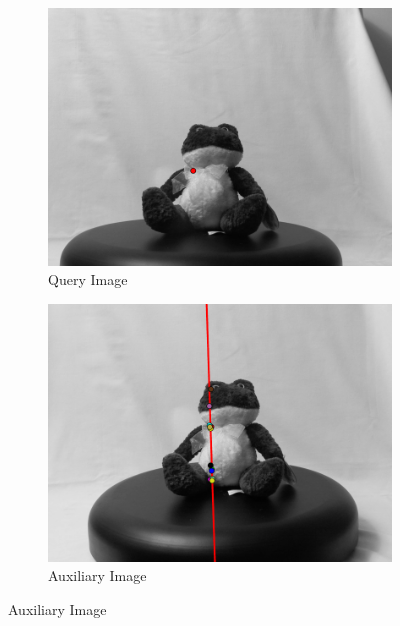 \documentclass[review]{elsarticle}
\begin{document}
\begin{figure}[htb]
    \centering
    \begin{subfigure}[t]{0.22\columnwidth}
        \centering
        \includegraphics[width=\columnwidth]{images/Frog_A}
        \caption{Query Image}
        \label{fig:frog_a}
    \end{subfigure}%
    \quad %
    \begin{subfigure}[t]{0.22\columnwidth}
        \centering
        \includegraphics[width=\columnwidth]{images/Frog_B}
        \caption{Auxiliary Image}
        \label{fig:frog_b}
    \end{subfigure}%

\end{figure}
\end{document}
